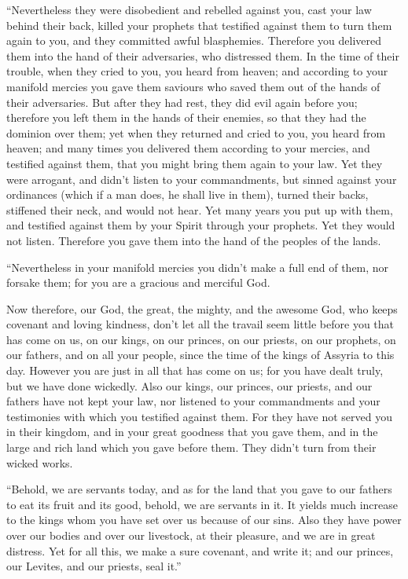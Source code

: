  ``Nevertheless they were disobedient and rebelled
against you, cast your law behind their back, killed your prophets that
testified against them to turn them again to you, and they committed
awful blasphemies.  Therefore you delivered them into the
hand of their adversaries, who distressed them. In the time of their
trouble, when they cried to you, you heard from heaven; and according to
your manifold mercies you gave them saviours who saved them out of the
hands of their adversaries.  But after they had rest,
they did evil again before you; therefore you left them in the hands of
their enemies, so that they had the dominion over them; yet when they
returned and cried to you, you heard from heaven; and many times you
delivered them according to your mercies,  and testified
against them, that you might bring them again to your law. Yet they were
arrogant, and didn't listen to your commandments, but sinned against
your ordinances (which if a man does, he shall live in them), turned
their backs, stiffened their neck, and would not hear. 
Yet many years you put up with them, and testified against them by your
Spirit through your prophets. Yet they would not listen. Therefore you
gave them into the hand of the peoples of the lands.

 ``Nevertheless in your manifold mercies you didn't make
a full end of them, nor forsake them; for you are a gracious and
merciful God.

 Now therefore, our God, the great, the mighty, and the
awesome God, who keeps covenant and loving kindness, don't let all the
travail seem little before you that has come on us, on our kings, on our
princes, on our priests, on our prophets, on our fathers, and on all
your people, since the time of the kings of Assyria to this day.
 However you are just in all that has come on us; for you
have dealt truly, but we have done wickedly.  Also our
kings, our princes, our priests, and our fathers have not kept your law,
nor listened to your commandments and your testimonies with which you
testified against them.  For they have not served you in
their kingdom, and in your great goodness that you gave them, and in the
large and rich land which you gave before them. They didn't turn from
their wicked works.

 ``Behold, we are servants today, and as for the land
that you gave to our fathers to eat its fruit and its good, behold, we
are servants in it.  It yields much increase to the kings
whom you have set over us because of our sins. Also they have power over
our bodies and over our livestock, at their pleasure, and we are in
great distress.  Yet for all this, we make a sure
covenant, and write it; and our princes, our Levites, and our priests,
seal it.''

